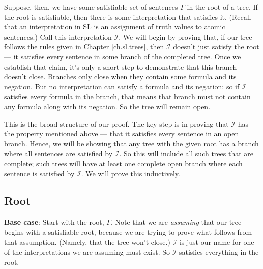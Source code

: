 Suppose, then, we have some satisfiable set of sentences $\Gamma$ in the root of a tree. If the root is satisfiable, then there is some interpretation that satisfies it. (Recall that an interpretation in SL is an assignment of truth values to atomic sentences.) Call this interpretation $\mathcal{I}$. We will begin by proving that, if our tree follows the rules given in Chapter \ref{ch.sl.trees}, then $\mathcal{I}$ doesn't just satisfy the root --- it satisfies every sentence in some branch of the completed tree. Once we establish that claim, it's only a short step to demonstrate that this branch doesn't close. Branches only close when they contain some formula and its negation. But no interpretation can satisfy a formula and its negation; so if $\mathcal{I}$ satisfies every formula in the branch, that means that branch must not contain any formula along with its negation. So the tree will remain open.

This is the broad structure of our proof. The key step is in proving that $\mathcal{I}$ has the property mentioned above --- that it satisfies every sentence in an open branch. {\color{black} Hence, we will be showing that any tree with the given root has a branch where all sentences are satisfied by $\mathcal{I}$. So this will include all such trees that are complete; such trees will have at least one complete open branch where each sentence is satisfied by $\mathcal{I}$.} We will prove this inductively.

\subsection{Root}

\textbf{Base case}: Start with the root, $\Gamma$. Note that we are \emph{assuming} that our tree begins with a satisfiable root, because we are trying to prove what follows from that assumption. (Namely, that the tree won't close.) $\mathcal{I}$ is just our name for one of the interpretations we are assuming must exist. So $\mathcal{I}$ satisfies everything in the root. 



